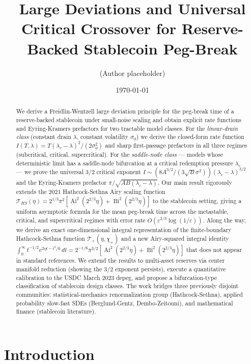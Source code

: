 \documentclass[11pt,a4paper]{article}
\title{Large Deviations and Universal Critical Crossover for Reserve-Backed Stablecoin Peg-Break}
\author{(Author placeholder)}
\date{\today}
\theoremstyle{plain}
\theoremstyle{definition}
\newcommand{\eps}{\varepsilon}
\newcommand{\Ai}{\operatorname{Ai}}
\newcommand{\Bi}{\operatorname{Bi}}
\begin{document}
\maketitle

\begin{abstract}
We derive a Freidlin-Wentzell large deviation principle for the peg-break time of a reserve-backed stablecoin under small-noise scaling and obtain explicit rate functions and Eyring-Kramers prefactors for two tractable model classes.
For the \emph{linear-drain class} (constant drain $\lambda$, constant volatility $\sigma_0$) we derive the closed-form rate function $I(T,\lambda) = T(\lambda_c - \lambda)^2/(2\sigma_0^2)$ and sharp first-passage prefactors in all three regimes (subcritical, critical, supercritical).
For the \emph{saddle-node class} --- models whose deterministic limit has a saddle-node bifurcation at a critical redemption pressure $\lambda_c$ --- we prove the universal $3/2$ critical exponent $I \sim (8A^{3/2}/(3\sqrt B\sigma^2))(\lambda_c-\lambda)^{3/2}$ and the Eyring-Kramers prefactor $\pi/\sqrt{AB(\lambda_c-\lambda)}$.
Our main result rigorously extends the 2021 Hathcock-Sethna Airy scaling function $\mathcal T_{HS}(\eta) = 2^{1/3}\pi^2[\Ai^2(2^{2/3}\eta) + \Bi^2(2^{2/3}\eta)]$ to the stablecoin setting, giving a uniform asymptotic formula for the mean peg-break time across the metastable, critical, and supercritical regimes with error rate $O(\eps^{2/3}\log(1/\eps))$.
Along the way, we derive an exact one-dimensional integral representation of the finite-boundary Hathcock-Sethna function $\mathcal T_+(\eta,\chi_+)$ and a new Airy-squared integral identity $\int_0^\infty t^{-1/2} e^{2\eta t - t^3/6}\,dt = 2^{-1/6}\pi^{3/2}[\Ai^2(2^{2/3}\eta) + \Bi^2(2^{2/3}\eta)]$ that does not appear in standard references.
We extend the results to multi-asset reserves via center manifold reduction (showing the $3/2$ exponent persists), execute a quantitative calibration to the USDC March 2023 depeg, and propose a bifurcation-type classification of stablecoin design classes.
The work bridges three previously disjoint communities: statistical-mechanics renormalization group (Hathcock-Sethna), applied probability slow-fast SDEs (Berglund-Gentz, Dembo-Zeitouni), and mathematical finance (stablecoin literature).
\end{abstract}

\section{Introduction}
\end{document}
